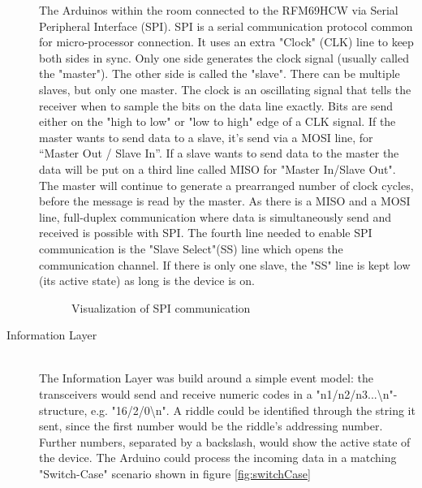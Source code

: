 \begin{description}
          The Arduinos within the room connected to the RFM69HCW via Serial Peripheral Interface (SPI).
          SPI is a serial communication protocol common for micro-processor connection. 
          It uses an extra "Clock" (CLK) line to keep both sides in sync. 
          Only one side generates the clock signal (usually called the "master"). The other side is called the "slave".
          There can be multiple slaves, but only one master.
          The clock is an oscillating signal that tells 
          the receiver when to sample the bits on the data line exactly. 
          Bits are send either on the "high to low" or "low to high" edge of a CLK signal.
          If the master wants to send data to a slave, it's send via a MOSI line, for “Master Out / Slave In”.
          If a slave wants to send data to the master the data will be put on a third line called MISO for "Master In/Slave Out".
          The master will continue to generate a prearranged number of clock cycles, before the message is read by the master.
          As there is a MISO and a MOSI line, full-duplex communication where data is simultaneously send and received is possible with SPI.
          The fourth line needed to enable SPI communication is the "Slave Select"(SS) line which opens the communication channel. 
          If there is only one slave, the "SS" line is kept low (its active state) as long is the device is on. 

          \begin{figure*}[h]
            \centering
            \caption{Visualization of SPI communication}
          \end{figure*}
          
	\item[Information Layer]\hfill \\
        The Information Layer was build around a simple event model: the transceivers would send and receive numeric codes in a "n1/n2/n3...\textbackslash n"-structure, e.g. "16/2/0\textbackslash n". 
        A riddle could be identified through the string it sent, since the first number would be the riddle's addressing number. 
        Further numbers, separated by a backslash, would show the active state of the device. 
        The Arduino could process the incoming data in a matching "Switch-Case" scenario shown in figure \ref{fig:switchCase}


\end{description}
